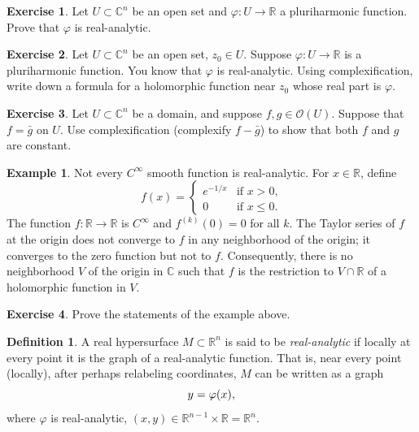 \documentclass[12pt,openany]{book}
\newcommand{\avoidbreak}{\postdisplaypenalty=100}
\newcommand{\C}{{\mathbb{C}}}
\newcommand{\R}{{\mathbb{R}}}
\newcommand{\sO}{{\mathscr{O}}}
\theoremstyle{plain}
\theoremstyle{remark}
\theoremstyle{definition}
\newtheorem{defn}[thm]{Definition}
\newenvironment{exbox}{%
    \def\FrameCommand{\vrule width 1pt \relax\hspace{10pt}}%
    \MakeFramed{\advance\hsize-\width\FrameRestore}%
}{%
    \endMakeFramed
}
\theoremstyle{exercise}
\newtheorem{exercise}{Exercise}[section]
\theoremstyle{example}
\newtheorem{example}[thm]{Example}
\begin{document}
\begin{exbox}
\begin{exercise}
Let $U \subset \C^n$ be an open set and $\varphi \colon U \to \R$ a
pluriharmonic function.  Prove that $\varphi$ is real-analytic.
\end{exercise}

\begin{exercise}
Let $U \subset \C^n$ be an open set, $z_0 \in U$.
Suppose $\varphi \colon U \to \R$ is a pluriharmonic function.
You know that $\varphi$ is real-analytic.
Using complexification, write down a formula for a holomorphic function near
$z_0$ whose real part is $\varphi$.
\end{exercise}

\begin{exercise}
Let $U \subset \C^n$ be a domain, and suppose $f, g \in \sO(U)$.
Suppose that $f = \bar{g}$ on $U$.  Use complexification (complexify
$f-\bar{g}$) to show that both $f$ and $g$ are constant.
\end{exercise}
\end{exbox}

\begin{example}
Not every $C^\infty$ smooth function is real-analytic.  For $x \in \R$,
define
\begin{equation*}
f(x) =
\begin{cases}
e^{-1/x} & \text{if $x > 0$,} \\
0 & \text{if $x \leq 0$.}
\end{cases}
\end{equation*}
The function
$f \colon \R \to \R$ is $C^\infty$ and $f^{(k)}(0) = 0$ for all $k$.
The Taylor series of $f$ at the origin does
not converge to $f$ in any neighborhood of the origin; it converges to the
zero function but not to $f$.
Consequently, there is no neighborhood $V$ of the origin in $\C$ such that
$f$ is the restriction to $V \cap \R$ of a holomorphic function in $V$.
\end{example}

\begin{exbox}
\begin{exercise}
Prove the statements of the example above.
\end{exercise}
\end{exbox}

\begin{defn}\label{def:rahypersurfacesimple}
A real hypersurface $M \subset \R^n$ is said to be
\emph{real-analytic}
if locally at every point it is the graph of a real-analytic function.  That
is, near every point (locally), after perhaps relabeling coordinates,
$M$ can be written as
a graph
\begin{equation*}
y = \varphi(x) ,
\avoidbreak
\end{equation*}
where $\varphi$ is real-analytic, $(x,y) \in \R^{n-1} \times \R = \R^n$.
\end{defn}
\end{document}
